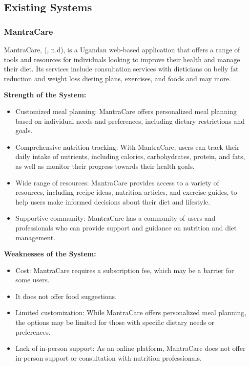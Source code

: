 \documentclass{article}
\begin{document}
\subsection{Existing Systems}

\subsubsection{MantraCare}

MantraCare, (, n.d), is a Ugandan web-based application that offers a range of tools and resources for individuals looking to improve their health and manage their diet. Its services include consultation services with dieticians on belly fat reduction and weight loss dieting plans, exercises, and foods and may more.

\textbf{Strength of the System:}

\begin{itemize}

\item Customized meal planning: MantraCare offers personalized meal planning based on individual needs and preferences, including dietary restrictions and goals.
\item Comprehensive nutrition tracking: With MantraCare, users can track their daily intake of nutrients, including calories, carbohydrates, protein, and fats, as well as monitor their progress towards their health goals.
\item Wide range of resources: MantraCare provides access to a variety of resources, including recipe ideas, nutrition articles, and exercise guides, to help users make informed decisions about their diet and lifestyle.
\item Supportive community: MantraCare has a community of users and professionals who can provide support and guidance on nutrition and diet management.

\end{itemize}

\textbf{Weaknesses of the System:}

\begin{itemize}
\item Cost: MantraCare requires a subscription fee, which may be a barrier for some users.
\item It does not offer food suggestions.
\item Limited customization: While MantraCare offers personalized meal planning, the options may be limited for those with specific dietary needs or preferences.
\item Lack of in-person support: As an online platform, MantraCare does not offer in-person support or consultation with nutrition professionals.

\end{itemize}
\end{document}
